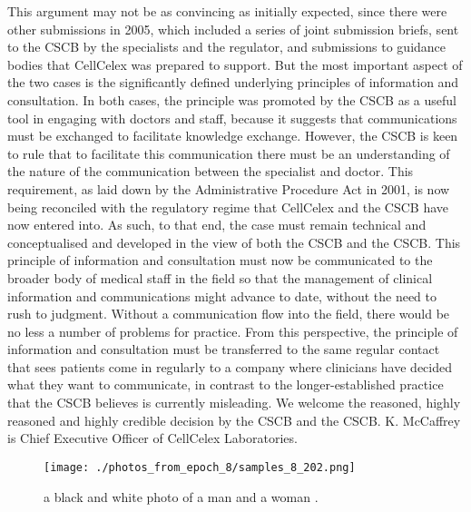 \documentclass{article}%
\begin{document}
This argument may not be as convincing as initially expected, since there were other submissions in 2005, which included a series of joint submission briefs, sent to the CSCB by the specialists and the regulator, and submissions to guidance bodies that CellCelex was prepared to support. But the most important aspect of the two cases is the significantly defined underlying principles of information and consultation.\newline%
In both cases, the principle was promoted by the CSCB as a useful tool in engaging with doctors and staff, because it suggests that communications must be exchanged to facilitate knowledge exchange. However, the CSCB is keen to rule that to facilitate this communication there must be an understanding of the nature of the communication between the specialist and doctor. This requirement, as laid down by the Administrative Procedure Act in 2001, is now being reconciled with the regulatory regime that CellCelex and the CSCB have now entered into. As such, to that end, the case must remain technical and conceptualised and developed in the view of both the CSCB and the CSCB.\newline%
This principle of information and consultation must now be communicated to the broader body of medical staff in the field so that the management of clinical information and communications might advance to date, without the need to rush to judgment. Without a communication flow into the field, there would be no less a number of problems for practice. From this perspective, the principle of information and consultation must be transferred to the same regular contact that sees patients come in regularly to a company where clinicians have decided what they want to communicate, in contrast to the longer{-}established practice that the CSCB believes is currently misleading.\newline%
We welcome the reasoned, highly reasoned and highly credible decision by the CSCB and the CSCB.\newline%
K. McCaffrey is Chief Executive Officer of CellCelex Laboratories.\newline%

%


\begin{figure}[h!]%
\centering%
\texttt{[image: ./photos\_from\_epoch\_8/samples\_8\_202.png]}%
\caption{a black and white photo of a man and a woman .}%
\end{figure}

%
\end{document}
